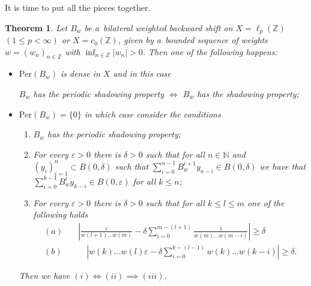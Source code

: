 \documentclass[11pt,a4paper]{amsart}
\newtheorem{theorem}{Theorem}[section]
\theoremstyle{definition}
\newcommand{\Z}{\mathbb{Z}}
\newcommand{\N}{\mathbb{N}}
\newcommand{\eps}{\varepsilon}
\newcommand{\abs}[1]{\left| #1 \right|}
\newcommand{\Per}{\mathrm{Per}}
\begin{document}
	It is time to put all the pieces together.
	
	\begin{theorem} \label{thm:PSPabstract}
		Let $B_w$ be a~bilateral weighted backward shift on \(X = \ell_p(\Z)\) \((1 \leq p < \infty)\) or \(X = c_0(\Z)\), given by a~bounded sequence of weights \(w = (w_n)_{n \in \Z}\) with \(\inf_{n \in \Z}\abs{w_n} > 0\). Then one of the following happens:
		\begin{itemize}
			\item $\Per(B_w)$ is dense in $X$ and in this case
			\begin{center}
				$B_w$ has the periodic shadowing property $\iff$ $B_w$ has the shadowing property;
			\end{center}
			\item $\Per(B_w) = \{0\}$ in which case consider the conditions
			\begin{enumerate}
				\item $B_w$ has the periodic shadowing property;
				\item For every $\eps > 0$ there is $\delta > 0$ such that for all $n \in \N$ and $(y_i)_{i=1}^n \subset B(0, \delta)$ such that $\sum_{i=0}^{n-1} B_w^{i+1} y_{n-i} \in B(0, \delta)$ we have that $\sum_{i=0}^{k-1} B_w^i y_{k-i} \in B(0, \eps)$ for all $k \leq n$;
				\item For every $\eps > 0$ there is $\delta > 0$ such that for all $k \leq l \leq m$ one of the following holds
				\begin{align*}
					(a) &\quad \abs{\frac{\varepsilon}{w(l+1)\dots w(m)}- \delta \sum_{i=0}^{m-(l+1)}\frac{1}{w(m) \dots w(m-i)}} \geq \delta \\
					(b) &\quad\quad \abs{w(k) \dots w(l)\varepsilon -\delta\sum_{i=0}^{k-(l-1)}w(k) \dots w(k-i)} \geq \delta.
				\end{align*}
			\end{enumerate}
			Then we have $(i) \iff (ii) \implies (iii)$.
		\end{itemize}
	\end{theorem}
\end{document}
